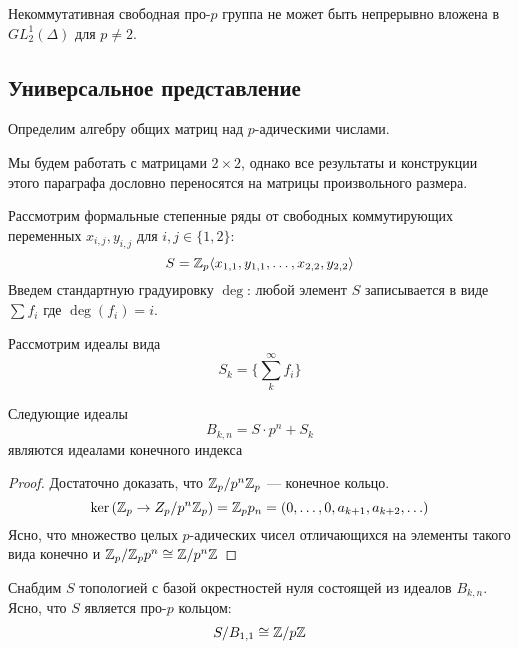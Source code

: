 \begin{theorem}[Зубков, 1989]
    \label{thm:Zubkov-main}
    Некоммутативная свободная про-$p$ группа не может быть непрерывно вложена в $GL^1_2(\Delta)$ для $p\neq 2$.
\end{theorem}

\subsection{Универсальное представление}\label{subsec:zubkov-universal}
Определим алгебру общих матриц над $p$-адическими числами.

Мы будем работать с матрицами $2\times2$, однако все результаты и конструкции этого параграфа дословно переносятся на матрицы произвольного размера.

Рассмотрим формальные степенные ряды от свободных коммутирующих переменных $x_{i,j}, y_{i,j}$ для $i,j \in \{ 1, 2 \}$:
\[
    S = \mathbb{Z}_{p}\langle x_{1,1}, y_{1,1}, \ldots, x_{2,2}, y_{2,2} \rangle
\]
Введем стандартную градуировку $\deg$: любой элемент $S$ записывается в виде $\sum f_i$ где $\deg{(f_i)} = i$.

Рассмотрим идеалы вида
\[
    S_k = \{\sum\limits_k^{\infty} f_i \}
\]

\vskip 0.1in\noindent
\begin{proposition}
    Следующие идеалы
    \[B_{k,n} = S \cdot p^n + S_k \]
    являются идеалами конечного индекса
\end{proposition}
\begin{proof}
    Достаточно доказать, что $\mathbb{Z}_p / p^n\mathbb{Z}_p$ --- конечное кольцо.
    \[
        \ker{(\ensuremath{\mathbb{Z}}_p \to Z_p / p^n\ensuremath{\mathbb{Z}}_p )} = \mathbb{Z}_p p_n = \left( 0,\ldots, 0, a_{k+1}, a_{k+2}, \ldots \right)
    \]
    Ясно, что множество целых $p$-адических чисел отличающихся на элементы такого вида конечно и
    $\mathbb{Z}_p / \mathbb{Z}_p p^n \cong \mathbb{Z} / p^n\mathbb{Z}$
\end{proof}

Снабдим $S$ топологией с базой окрестностей нуля состоящей из идеалов $B_{k,n}$.
Ясно, что $S$ является про-$p$ кольцом:
\[
    S / B_{1,1} \cong \mathbb{Z}/p\mathbb{Z}
\]

